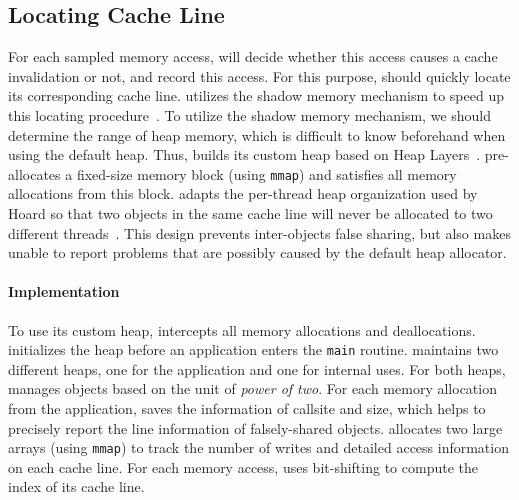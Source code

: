 \subsection{Locating Cache Line}
\label{sec:shadow}

For each sampled memory access, \cheetah{} will decide whether this access causes a cache invalidation or not, and record this access. For this purpose, \cheetah{} should quickly locate its corresponding cache line. \Cheetah{} utilizes the shadow memory mechanism to speed up this locating procedure~\cite{qinzhao, Predator}. 
To utilize the shadow memory mechanism, we should determine the range of heap memory, which is difficult to know beforehand when using the default heap. Thus, \cheetah{} builds its custom heap based on Heap Layers~\cite{Berger:2001:CHM:378795.378821}. \cheetah{} pre-allocates a fixed-size memory block (using \texttt{mmap}) and satisfies all memory allocations from this block. \cheetah{} adapts the per-thread heap organization used by Hoard so that two objects in the same cache line will never be allocated to two different threads~\cite{Hoard}. This design prevents inter-objects false sharing, but also makes \cheetah{} unable to report problems that are possibly caused by the default heap allocator.  

\paragraph{Implementation} 
To use its custom heap, \cheetah{} intercepts all memory allocations and deallocations. \cheetah{} initializes the heap before an application enters the \texttt{main} routine. \cheetah{} maintains two different heaps, one for the application and one for internal uses. For both heaps, \cheetah{} manages objects based on the unit of {\it power of two}. For each memory allocation from the application, \cheetah{} saves the information of callsite and size, which helps \cheetah{} to precisely report the line information of falsely-shared objects.  
\Cheetah{} allocates two large arrays (using \texttt{mmap}) to track the number of writes and detailed access information on each cache line. For each memory access, \cheetah{} uses bit-shifting to compute the index of its cache line. 


